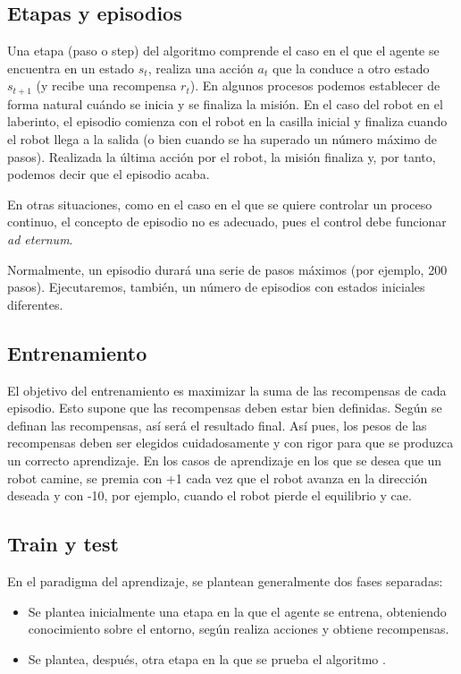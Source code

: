 \documentclass{article}
\begin{document}



\subsection{Etapas y episodios}
Una etapa (paso o step) del algoritmo comprende el caso en el que el agente se encuentra en un estado $s_t$, realiza una acción $a_t$ que la conduce a otro estado $s_{t+1}$ (y recibe una recompensa $r_t$).
En algunos procesos podemos establecer de forma natural cuándo se inicia y se finaliza la misión. En el caso del robot en el laberinto, el episodio comienza con el robot en la casilla inicial y finaliza cuando el robot llega a la salida (o bien cuando se ha superado un número máximo de pasos). Realizada la última acción por el robot, la misión finaliza y, por tanto, podemos decir que el episodio acaba.

En otras situaciones, como en el caso en el que se quiere controlar un proceso continuo, el concepto de episodio no es adecuado, pues el control debe funcionar \textit{ad eternum}.

Normalmente, un episodio durará una serie de pasos máximos (por ejemplo, 200 pasos).
Ejecutaremos, también, un número de episodios con estados iniciales diferentes. 

\subsection{Entrenamiento}

El objetivo del entrenamiento es maximizar la suma de las recompensas de cada episodio. Esto supone que las recompensas deben estar bien definidas. Según se definan las recompensas, así será el resultado final.  Así pues, los pesos de las recompensas deben ser elegidos cuidadosamente y con rigor para que se produzca un correcto aprendizaje. En los casos de aprendizaje en los que se desea que un robot camine, se premia con +1 cada vez que el robot avanza en la dirección deseada y con -10, por ejemplo, cuando el robot pierde el equilibrio y cae.



\subsection{Train y test}
En el paradigma del aprendizaje, se plantean generalmente dos fases separadas: 
\begin{itemize}
    \item Se plantea inicialmente una etapa en la que el agente se entrena, obteniendo conocimiento sobre el entorno, según realiza acciones y obtiene recompensas.
    
\item Se plantea, después, otra etapa en la que se prueba el algoritmo .
\end{itemize}
\end{document}
